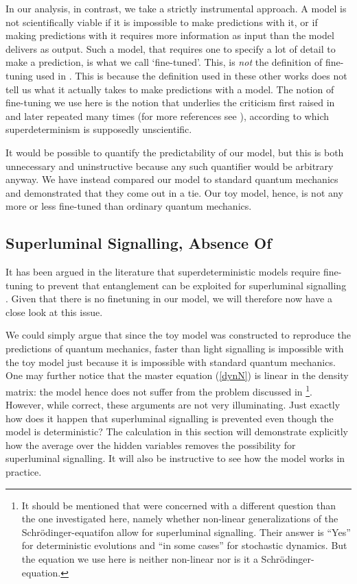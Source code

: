 \documentclass[12pt]{article}
\begin{document}
In our analysis, in contrast, we take a strictly instrumental approach. A model is not scientifically viable if it is impossible to make predictions with it, or if making predictions with it requires more information as input than the model delivers as output. Such a model, that requires one to specify a lot of detail to make a prediction, is what we call `fine-tuned'. This, is \emph{not} the definition of fine-tuning used in \cite{finetuning,Valentini1,Valentini2}. This is because the definition used in these other works does not tell us what it actually takes to make predictions with a model. The notion of fine-tuning we use here is the notion that underlies the criticism first raised in \cite{SC,Bell77} and later repeated many times (for more references see \cite{Hossenfelder:2019shy,Chen:2020yoa}), according to which superdeterminism is supposedly unscientific.  

It would be possible to quantify the predictability of our model, but this is both unnecessary and uninstructive because any such quantifier would be arbitrary anyway. We have instead compared our model to standard quantum mechanics and demonstrated that they come out in a tie. Our toy model, hence, is not any more or less fine-tuned than ordinary quantum mechanics. 
 


\subsection{Superluminal Signalling, Absence Of}
\label{fine}


It has been argued in the literature that superdeterministic models require fine-tuning to prevent that entanglement can be exploited for superluminal signalling \cite{finetuning,Bendersky}. Given that there is no finetuning in our model, we will therefore now have a close look at this issue.

We could simply argue that since the toy model was constructed to reproduce the predictions of quantum mechanics, 
faster than light signalling is impossible with the toy model just because it is impossible with standard quantum mechanics. 
One may further notice that the master equation (\ref{dynN}) is linear in the density matrix: the model hence does not suffer from the problem discussed in \cite{Gisin:1989sx,Bassi:2015jka} \footnote{It should be mentioned that \cite{Gisin:1989sx,Bassi:2015jka} were concerned with a different question than the one investigated here, namely whether non-linear generalizations of the Schr\"odinger-equatifon allow for superluminal signalling. Their answer is ``Yes'' for deterministic evolutions and ``in some cases'' for stochastic dynamics. But the equation we use here is neither non-linear nor is it a Schr\"odinger-equation. 
}. However, while correct, these arguments are not very illuminating. Just exactly how does it happen that superluminal signalling is prevented even though the model is deterministic? The calculation in this section will demonstrate explicitly how the average over the hidden variables removes the possibility for superluminal signalling. It will also be instructive to see how the model works in practice.
\end{document}
